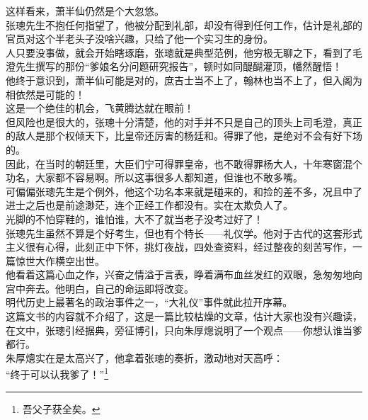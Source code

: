 \begin{multicols}{\theparacolNo}
这样看来，萧半仙仍然是个大忽悠。\\

张璁先生不抱任何指望了，他被分配到礼部，却没有得到任何工作，估计是礼部的官员对这个半老头子没啥兴趣，只给了他一个实习生的身份。\\

人只要没事做，就会开始瞎琢磨，张璁就是典型范例，他穷极无聊之下，看到了毛澄先生撰写的那份“爹娘名分问题研究报告”，顿时如同醍醐灌顶，幡然醒悟！\\

他终于意识到，萧半仙可能是对的，庶吉士当不上了，翰林也当不上了，但入阁为相依然是可能的！\\

这是一个绝佳的机会，飞黄腾达就在眼前！\\

但风险也是很大的，张璁十分清楚，他的对手并不只是自己的顶头上司毛澄，真正的敌人是那个权倾天下，比皇帝还厉害的杨廷和。得罪了他，是绝对不会有好下场的。\\

因此，在当时的朝廷里，大臣们宁可得罪皇帝，也不敢得罪杨大人，十年寒窗混个功名，大家都不容易啊。所以这事很多人都知道，但谁也不敢多嘴。\\

可偏偏张璁先生是个例外，他这个功名本来就是碰来的，和捡的差不多，况且中了进士之后也是前途渺茫，连个正经工作都没有。实在太欺负人了。\\

光脚的不怕穿鞋的，谁怕谁，大不了就当老子没考过好了！\\

张璁先生虽然不算是个好考生，但也有个特长——礼仪学。他对于古代的这套形式主义很有心得，此刻正中下怀，挑灯夜战，四处查资料，经过整夜的刻苦写作，一篇惊世大作横空出世。\\

他看着这篇心血之作，兴奋之情溢于言表，睁着满布血丝发红的双眼，急匆匆地向宫中奔去。他明白，自己的命运即将改变。\\

明代历史上最著名的政治事件之一，“大礼仪”事件就此拉开序幕。\\

这篇文书的内容就不介绍了，这是一篇比较枯燥的文章，估计大家也没有兴趣读，在文中，张璁引经据典，旁征博引，只向朱厚熜说明了一个观点——你想认谁当爹都行。\\

朱厚熜实在是太高兴了，他拿着张璁的奏折，激动地对天高呼：\\

“终于可以认我爹了！”\footnote{吾父子获全矣。}\\


\end{multicols}
